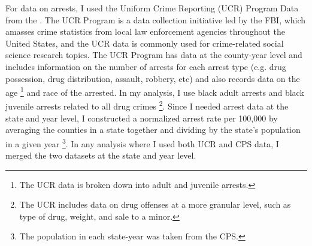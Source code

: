 \documentclass{article}
\begin{document}
For data on arrests, I used the Uniform Crime Reporting (UCR) Program Data from the \cite{ucr}. The UCR Program is a data collection initiative led by the FBI, which amasses crime statistics from local law enforcement agencies throughout the United States, and the UCR data is commonly used for crime-related social science research topics. The UCR Program has data at the county-year level and includes information on the number of arrests for each arrest type (e.g. drug possession, drug distribution, assault, robbery, etc) and also records data on the age \footnote{The UCR data is broken down into adult and juvenile arrests.} and race of the arrested. In my analysis, I use black adult arrests and black juvenile arrests related to all drug crimes \footnote{The UCR includes data on drug offenses at a more granular level, such as type of drug, weight, and sale to a minor.}. Since I needed arrest data at the state and year level, I constructed a normalized arrest rate per 100,000 by averaging the counties in a state together and dividing by the state's population in a given year \footnote{The population in each state-year was taken from the CPS.}. In any analysis where I used both UCR and CPS data, I merged the two datasets at the state and year level.
\end{document}
